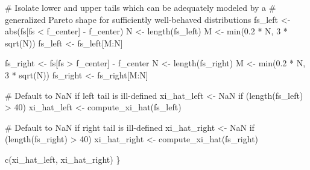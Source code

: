 \documentclass[
  letterpaper,
  DIV=11,
  numbers=noendperiod]{scrartcl}
\newenvironment{Shaded}{\begin{snugshade}}{\end{snugshade}}
\newcommand{\CommentTok}[1]{\textcolor[rgb]{0.37,0.37,0.37}{#1}}
\newcommand{\ConstantTok}[1]{\textcolor[rgb]{0.56,0.35,0.01}{#1}}
\newcommand{\ControlFlowTok}[1]{\textcolor[rgb]{0.00,0.23,0.31}{#1}}
\newcommand{\DecValTok}[1]{\textcolor[rgb]{0.68,0.00,0.00}{#1}}
\newcommand{\FloatTok}[1]{\textcolor[rgb]{0.68,0.00,0.00}{#1}}
\newcommand{\FunctionTok}[1]{\textcolor[rgb]{0.28,0.35,0.67}{#1}}
\newcommand{\NormalTok}[1]{\textcolor[rgb]{0.00,0.23,0.31}{#1}}
\newcommand{\OtherTok}[1]{\textcolor[rgb]{0.00,0.23,0.31}{#1}}
\newcommand{\SpecialCharTok}[1]{\textcolor[rgb]{0.37,0.37,0.37}{#1}}
\begin{document}
\begin{Shaded}
\begin{Highlighting}[]
  \CommentTok{\# Isolate lower and upper tails which can be adequately modeled by a }
  \CommentTok{\# generalized Pareto shape for sufficiently well{-}behaved distributions}
\NormalTok{  fs\_left }\OtherTok{\textless{}{-}} \FunctionTok{abs}\NormalTok{(fs[fs }\SpecialCharTok{\textless{}}\NormalTok{ f\_center] }\SpecialCharTok{{-}}\NormalTok{ f\_center)}
\NormalTok{  N }\OtherTok{\textless{}{-}} \FunctionTok{length}\NormalTok{(fs\_left)}
\NormalTok{  M }\OtherTok{\textless{}{-}} \FunctionTok{min}\NormalTok{(}\FloatTok{0.2} \SpecialCharTok{*}\NormalTok{ N, }\DecValTok{3} \SpecialCharTok{*} \FunctionTok{sqrt}\NormalTok{(N))}
\NormalTok{  fs\_left }\OtherTok{\textless{}{-}}\NormalTok{ fs\_left[M}\SpecialCharTok{:}\NormalTok{N]}
  
\NormalTok{  fs\_right }\OtherTok{\textless{}{-}}\NormalTok{ fs[fs }\SpecialCharTok{\textgreater{}}\NormalTok{ f\_center] }\SpecialCharTok{{-}}\NormalTok{ f\_center}
\NormalTok{  N }\OtherTok{\textless{}{-}} \FunctionTok{length}\NormalTok{(fs\_right)}
\NormalTok{  M }\OtherTok{\textless{}{-}} \FunctionTok{min}\NormalTok{(}\FloatTok{0.2} \SpecialCharTok{*}\NormalTok{ N, }\DecValTok{3} \SpecialCharTok{*} \FunctionTok{sqrt}\NormalTok{(N))}
\NormalTok{  fs\_right }\OtherTok{\textless{}{-}}\NormalTok{ fs\_right[M}\SpecialCharTok{:}\NormalTok{N]}
  
  \CommentTok{\# Default to NaN if left tail is ill{-}defined}
\NormalTok{  xi\_hat\_left }\OtherTok{\textless{}{-}} \ConstantTok{NaN}
  \ControlFlowTok{if}\NormalTok{ (}\FunctionTok{length}\NormalTok{(fs\_left) }\SpecialCharTok{\textgreater{}} \DecValTok{40}\NormalTok{)}
\NormalTok{    xi\_hat\_left }\OtherTok{\textless{}{-}} \FunctionTok{compute\_xi\_hat}\NormalTok{(fs\_left)}

  \CommentTok{\# Default to NaN if right tail is ill{-}defined}
\NormalTok{  xi\_hat\_right }\OtherTok{\textless{}{-}} \ConstantTok{NaN}
  \ControlFlowTok{if}\NormalTok{ (}\FunctionTok{length}\NormalTok{(fs\_right) }\SpecialCharTok{\textgreater{}} \DecValTok{40}\NormalTok{)}
\NormalTok{    xi\_hat\_right }\OtherTok{\textless{}{-}} \FunctionTok{compute\_xi\_hat}\NormalTok{(fs\_right)}

  \FunctionTok{c}\NormalTok{(xi\_hat\_left, xi\_hat\_right)}
\NormalTok{\}}


\end{Highlighting}
\end{Shaded}
\end{document}

